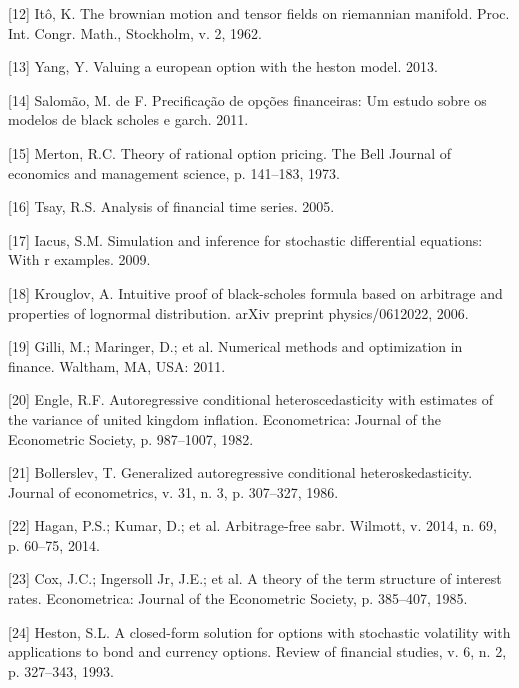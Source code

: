 \documentclass[12pt,oneside]{reedthesis}
\theoremstyle{definition}
\theoremstyle{definition}
\theoremstyle{remark}
\begin{document}
  \hypertarget{ref-ito1962}{}
  {[}12{]} Itô, K. The brownian motion and tensor fields on riemannian
  manifold. Proc. Int. Congr. Math., Stockholm, v. 2, 1962.
  
  \hypertarget{ref-yang2013valuing}{}
  {[}13{]} Yang, Y. Valuing a european option with the heston model. 2013.
  
  \hypertarget{ref-salomao2011precificaccao}{}
  {[}14{]} Salomão, M. de F. Precificação de opções financeiras: Um estudo
  sobre os modelos de black scholes e garch. 2011.
  
  \hypertarget{ref-merton1973theory}{}
  {[}15{]} Merton, R.C. Theory of rational option pricing. The Bell
  Journal of economics and management science, p. 141--183, 1973.
  
  \hypertarget{ref-tsay2005analysis}{}
  {[}16{]} Tsay, R.S. Analysis of financial time series. 2005.
  
  \hypertarget{ref-iacus2009simulation}{}
  {[}17{]} Iacus, S.M. Simulation and inference for stochastic
  differential equations: With r examples. 2009.
  
  \hypertarget{ref-krouglov2006intuitive}{}
  {[}18{]} Krouglov, A. Intuitive proof of black-scholes formula based on
  arbitrage and properties of lognormal distribution. arXiv preprint
  physics/0612022, 2006.
  
  \hypertarget{ref-nmof}{}
  {[}19{]} Gilli, M.; Maringer, D.; et al. Numerical methods and
  optimization in finance. Waltham, MA, USA: 2011.
  
  \hypertarget{ref-engle1982autoregressive}{}
  {[}20{]} Engle, R.F. Autoregressive conditional heteroscedasticity with
  estimates of the variance of united kingdom inflation. Econometrica:
  Journal of the Econometric Society, p. 987--1007, 1982.
  
  \hypertarget{ref-bollerslev1986generalized}{}
  {[}21{]} Bollerslev, T. Generalized autoregressive conditional
  heteroskedasticity. Journal of econometrics, v. 31, n. 3, p. 307--327,
  1986.
  
  \hypertarget{ref-hagan2014arbitrage}{}
  {[}22{]} Hagan, P.S.; Kumar, D.; et al. Arbitrage-free sabr. Wilmott, v.
  2014, n. 69, p. 60--75, 2014.
  
  \hypertarget{ref-cox1985theory}{}
  {[}23{]} Cox, J.C.; Ingersoll Jr, J.E.; et al. A theory of the term
  structure of interest rates. Econometrica: Journal of the Econometric
  Society, p. 385--407, 1985.
  
  \hypertarget{ref-heston1993closed}{}
  {[}24{]} Heston, S.L. A closed-form solution for options with stochastic
  volatility with applications to bond and currency options. Review of
  financial studies, v. 6, n. 2, p. 327--343, 1993.
  
\end{document}
